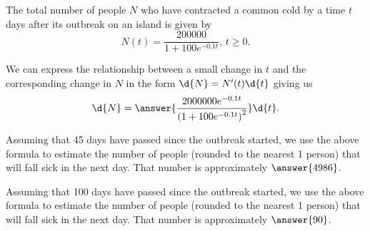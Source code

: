 \documentclass{ximera}
\author{Nela Lakos \and Kyle Parsons}
\begin{document}
\begin{exercise}

The total number of people $N$ who have contracted a common cold by a time $t$ days after its outbreak on an island is given by
\[
N(t) = \frac{200000}{1+100e^{-0.1t}},\,t\geq0.
\]

We can express the relationship between a small change in $t$ and the corresponding change in $N$ in the form $\d{N} = N'(t)\d{t}$ giving us
\[
\d{N} = \answer{\frac{2000000e^{-0.1t}}{\left(1+100e^{-0.1t}\right)^2}}\d{t}.
\]

Assuming that 45 days have passed since the outbreak started, we use the above formula to estimate the number of people (rounded to the nearest 1 person) that will fall sick in the next day. That number is approximately $\answer{4986}$.

Assuming that 100 days have passed since the outbreak started, we use the above formula to estimate the number of people (rounded to the nearest 1 person) that will fall sick in the next day. That number is approximately $\answer{90}$.

\end{exercise}
\end{document}
